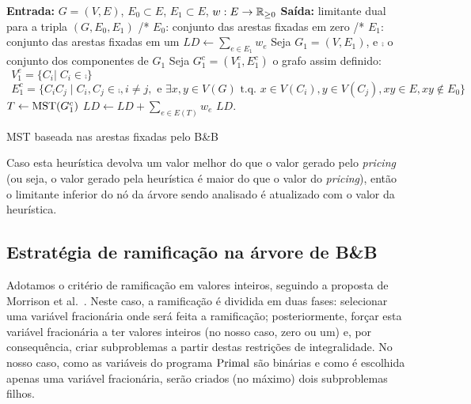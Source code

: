 \begin{algorithm}[t]
  \SetAlgoLined
  \textbf{Entrada:} {$G=(V,E)$, $E_0 \subset E$, $E_1 \subset E$, $w: E \to \mathbb{R}_{\ge 0}$}\;
  \textbf{Saída:} {limitante dual para a tripla $(G,E_0,E_1)$}\;
  /* $E_0$: conjunto das arestas fixadas em zero\;
  /* $E_1$: conjunto das arestas fixadas em um\;
  $LD \gets \sum_{e\in E_1}w_e$\;  
  Seja $G_1=(V,E_1)$, e $\comp$ o conjunto dos componentes de $G_1$\;
  Seja $G_{1}^{c} = (V^c_1,E^c_1)$ o grafo assim definido:\\
   $~~ V^c_1 = \{C_i | \; C_i \in \comp\}$\;
   $~~ E^c_1 = \{C_iC_j \; | \; C_i,C_j \in \comp, i \neq j,  \text{ e } \exists x,y \in V(G) \text{ t.q. } x \in V(C_i), y \in V(C_j), xy \in E, xy \notin E_0\}$\;
  $T \gets {\rm MST}(G^c_1)$\; 
  $LD \gets LD + \sum_{e \in E(T)}w_e$\;
  \Return $LD$.   
  \BlankLine 
  \caption{MST baseada nas arestas fixadas pelo B\&B} 
  \label{alg:mst_based_fixed_edges}
\end{algorithm}

Caso esta heurística devolva um valor melhor do que o valor gerado pelo
\emph{pricing} (ou seja, o valor gerado pela heurística é maior do que o valor
do \emph{pricing}), então o limitante inferior do nó da árvore sendo analisado
é atualizado com o valor da heurística.
\subsection{Estratégia de ramificação na árvore de B\&B}
\label{sec:estrategia_ramificacao}
Adotamos o critério de ramificação em valores inteiros, seguindo a
proposta de Morrison et al.~\cite{MorrisonJSS2016}.  Neste caso, a
ramificação é dividida em duas fases: selecionar uma variável
fracionária onde será feita a ramificação; posteriormente, forçar esta
variável fracionária a ter valores inteiros (no nosso caso, zero ou um)
e, por consequência, criar subproblemas a partir destas restrições de
integralidade. No nosso caso, como as variáveis do programa $\rm{Primal}$
são binárias e como é escolhida apenas uma variável fracionária, serão
criados (no máximo) dois subproblemas filhos.

